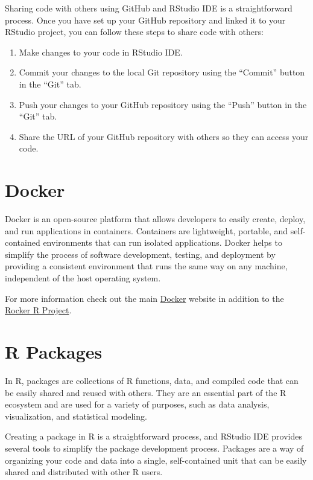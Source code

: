 \documentclass[
]{book}
\providecommand{\tightlist}{%
  \setlength{\itemsep}{0pt}\setlength{\parskip}{0pt}}
\begin{document}
Sharing code with others using GitHub and RStudio IDE is a straightforward process. Once you have set up your GitHub repository and linked it to your RStudio project, you can follow these steps to share code with others:

\begin{enumerate}
\def\labelenumi{\arabic{enumi}.}
\tightlist
\item
  Make changes to your code in RStudio IDE.
\item
  Commit your changes to the local Git repository using the ``Commit'' button in the ``Git'' tab.
\item
  Push your changes to your GitHub repository using the ``Push'' button in the ``Git'' tab.
\item
  Share the URL of your GitHub repository with others so they can access your code.
\end{enumerate}

\hypertarget{docker}{%
\section{Docker}\label{docker}}

Docker is an open-source platform that allows developers to easily create, deploy, and run applications in containers. Containers are lightweight, portable, and self-contained environments that can run isolated applications. Docker helps to simplify the process of software development, testing, and deployment by providing a consistent environment that runs the same way on any machine, independent of the host operating system.

For more information check out the main \href{https://www.docker.com/}{Docker} website in addition to the \href{https://rocker-project.org/}{Rocker R Project}.

\hypertarget{r-packages}{%
\section{R Packages}\label{r-packages}}

In R, packages are collections of R functions, data, and compiled code that can be easily shared and reused with others. They are an essential part of the R ecosystem and are used for a variety of purposes, such as data analysis, visualization, and statistical modeling.

Creating a package in R is a straightforward process, and RStudio IDE provides several tools to simplify the package development process. Packages are a way of organizing your code and data into a single, self-contained unit that can be easily shared and distributed with other R users.
\end{document}
